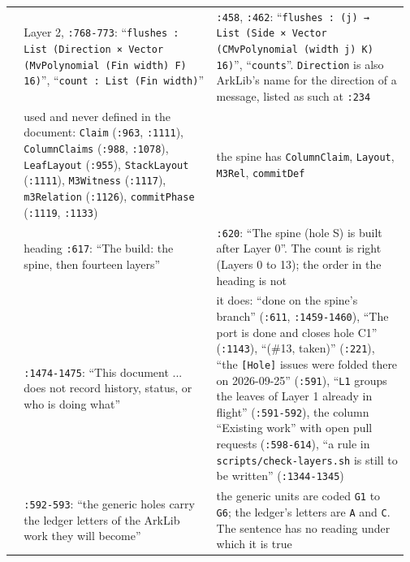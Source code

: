 {\begin{longtable}{@{}>{\raggedright\arraybackslash}p{0.029\linewidth}>{\raggedright\arraybackslash}p{0.470\linewidth}>{\raggedright\arraybackslash}p{0.470\linewidth}@{}}
8 & Layer 2, \texttt{:\allowbreak{}768-\allowbreak{}773}: ``\texttt{flushes :\allowbreak{} List (\allowbreak{}Direction × Vector (\allowbreak{}Mv\allowbreak{}Polynomial (\allowbreak{}Fin width) F) 16)}'', ``\texttt{count :\allowbreak{} List (\allowbreak{}Fin width)}'' & \texttt{:\allowbreak{}458}, \texttt{:\allowbreak{}462}: ``\texttt{flushes :\allowbreak{} (\allowbreak{}j) → List (\allowbreak{}Side × Vector (\allowbreak{}CMv\allowbreak{}Polynomial (\allowbreak{}width j) K) 16)}'', ``\texttt{counts}''. \texttt{Direction} is also ArkLib's name for the direction of a message, listed as such at \texttt{:\allowbreak{}234} \\\addlinespace[2pt]
9 & used and never defined in the document: \texttt{Claim} (\texttt{:\allowbreak{}963}, \texttt{:\allowbreak{}1111}), \texttt{ColumnClaims} (\texttt{:\allowbreak{}988}, \texttt{:\allowbreak{}1078}), \texttt{LeafLayout} (\texttt{:\allowbreak{}955}), \texttt{StackLayout} (\texttt{:\allowbreak{}1111}), \texttt{M3Witness} (\texttt{:\allowbreak{}1117}), \texttt{m3Relation} (\texttt{:\allowbreak{}1126}), \texttt{commitPhase} (\texttt{:\allowbreak{}1119}, \texttt{:\allowbreak{}1133}) & the spine has \texttt{ColumnClaim}, \texttt{Layout}, \texttt{M3Rel}, \texttt{commitDef} \\\addlinespace[2pt]
10 & heading \texttt{:\allowbreak{}617}: ``The build: the spine, then fourteen layers'' & \texttt{:\allowbreak{}620}: ``The spine (hole S) is built after Layer 0''. The count is right (Layers 0 to 13); the order in the heading is not \\\addlinespace[2pt]
11 & \texttt{:\allowbreak{}1474-\allowbreak{}1475}: ``This document ... does not record history, status, or who is doing what'' & it does: ``done on the spine's branch'' (\texttt{:\allowbreak{}611}, \texttt{:\allowbreak{}1459-\allowbreak{}1460}), ``The port is done and closes hole C1'' (\texttt{:\allowbreak{}1143}), ``(\#13, taken)'' (\texttt{:\allowbreak{}221}), ``the \texttt{[Hole]} issues were folded there on 2026-09-25'' (\texttt{:\allowbreak{}591}), ``\texttt{L1} groups the leaves of Layer 1 already in flight'' (\texttt{:\allowbreak{}591-\allowbreak{}592}), the column ``Existing work'' with open pull requests (\texttt{:\allowbreak{}598-\allowbreak{}614}), ``a rule in \texttt{scripts/\allowbreak{}check-\allowbreak{}layers.\allowbreak{}sh} is still to be written'' (\texttt{:\allowbreak{}1344-\allowbreak{}1345}) \\\addlinespace[2pt]
12 & \texttt{:\allowbreak{}592-\allowbreak{}593}: ``the generic holes carry the ledger letters of the ArkLib work they will become'' & the generic units are coded \texttt{G1} to \texttt{G6}; the ledger's letters are \texttt{A} and \texttt{C}. The sentence has no reading under which it is true \\
\end{longtable}}

